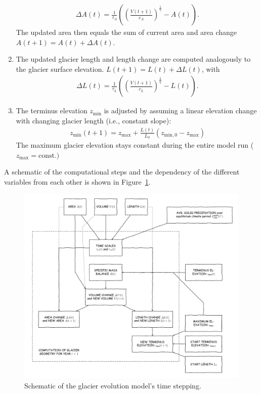 \begin{enumerate}
            \begin{align}
                \Delta A(t) = \frac{1}{\tau_A}\left(\left(\frac{V(t+1)}{c_A}\right)^\frac{1}{\gamma} - A(t)\right).
            \end{align}
            The updated area then equals the sum of current area and area change $A(t+1) = A(t) + \Delta A(t)$.
            \item The updated glacier length and length change are computed analogously to the glacier surface elevation. $L(t+1) = L(t) + \Delta L(t)$, with
            \begin{align}
                \Delta L(t) = \frac{1}{\tau_L}\left(\left(\frac{V(t+1)}{c_L}\right)^\frac{1}{q} - L(t)\right).
            \end{align}
            \item The terminus elevation $z_\text{min}$ is adjusted by assuming a linear elevation change with changing glacier length (i.e., constant slope):
            \begin{align}
                z_\text{min}(t+1) = z_\text{max} + \frac{L(t)}{L_0}(z_{\text{min},0} - z_\text{max})
            \end{align}
            The maximum glacier elevation stays constant during the entire model run ($z_\text{max} = \text{const.})$
            
        \end{enumerate}
        A schematic of the computational steps and the dependency of the different variables from each other is shown in Figure~\ref{fig:iteration-scheme}.
        
        \begin{figure}[tbh]
            \centering
            \includegraphics[width=\textwidth]{../flowchart/iterations/scaling.pdf}
            \caption{Schematic of the glacier evolution model's time stepping.}
            \label{fig:iteration-scheme}
        \end{figure}
    
